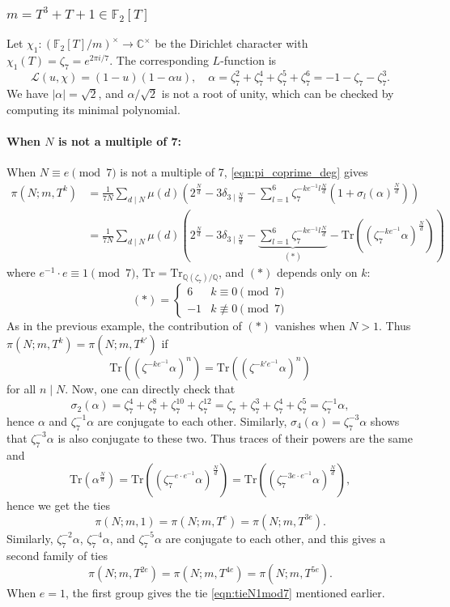 \documentclass[10pt,reqno]{amsproc}
\newcommand{\Tr}{\mathrm{Tr}}
\newcommand{\bC}{\mathbb{C}}
\newcommand{\bF}{\mathbb{F}}
\newcommand{\bQ}{\mathbb{Q}}
\newcommand{\cL}{\mathcal{L}}
\newcommand{\1}{\mathds{1}}	%
\theoremstyle{definition}
\theoremstyle{remark}
\begin{document}
\subsubsection{\texorpdfstring{\(m = T^3 + T + 1 \in \bF_2[T]\)}{m = T^3 + T + 1 over characteristic 2}}
\label{subsubsec:p2T3T1}

Let \(\chi_1: (\bF_2[T] / m)^\times \to \bC^\times\) be the Dirichlet character with \(\chi_1(T) = \zeta_7 = e^{2\pi i / 7}\).
The corresponding \(L\)-function is
\[
\cL(u, \chi) = (1 - u)(1 - \alpha u), \quad \alpha = \zeta_7^2 + \zeta_7^4 + \zeta_7^5 + \zeta_7^6 = -1 - \zeta_7 - \zeta_7^3.
\]
We have \(|\alpha| = \sqrt{2}\), and $\alpha / \sqrt{2}$ is not a root of unity, which can be checked by computing its minimal polynomial.

\paragraph{\textbf{When $N$ is not a multiple of 7:}}
When $N \equiv e \pmod{7}$ is not a multiple of 7, \eqref{eqn:pi_coprime_deg} gives
\begin{align*}
    \pi(N; m, T^k) &= \frac{1}{7N} \sum_{d \mid N} \mu(d) \left(2^{\frac{N}{d}} - 3 \delta_{3 \mid \frac{N}{d}} - \sum_{l=1}^{6} \zeta_7^{-ke^{-1}l \frac{N}{d}} (1 + \sigma_l(\alpha)^{\frac{N}{d}})\right) \\
    &= \frac{1}{7N} \sum_{d \mid N} \mu(d) \left(2^{\frac{N}{d}} - 3 \delta_{3 \mid \frac{N}{d}} - \underbrace{\sum_{l=1}^{6} \zeta_7^{-ke^{-1}l \frac{N}{d}}}_{(*)}  - \Tr((\zeta_7^{-ke^{-1}} \alpha)^{\frac{N}{d}})\right)
\end{align*}
where $e^{-1} \cdot e \equiv 1 \pmod{7}$, $\Tr = \Tr_{\bQ(\zeta_7) / \bQ}$, and $(*)$ depends only on $k$:
\[
(*) = \begin{cases}
    6 & k \equiv 0 \pmod{7} \\ -1 & k \not\equiv 0 \pmod{7}
\end{cases}
\]
As in the previous example, the contribution of $(*)$ vanishes when $N > 1$.
Thus $\pi(N; m, T^k) = \pi(N; m, T^{k'})$ if
\[
\Tr((\zeta^{-ke^{-1}} \alpha)^{n}) = \Tr((\zeta^{-k'e^{-1}}\alpha)^{n})
\]
for all $n \mid N$.
Now, one can directly check that
\begin{equation}
    \label{eqn:T3T1conj}
\sigma_2(\alpha) = \zeta_7^4 + \zeta_7^8 + \zeta_7^{10} + \zeta_7^{12} = \zeta_{7} + \zeta_{7}^{3} + \zeta_{7}^{4} + \zeta_{7}^{5} = \zeta_{7}^{-1} \alpha,
\end{equation}
hence \(\alpha\) and \(\zeta_7^{-1} \alpha\) are conjugate to each other.
Similarly, \(\sigma_4(\alpha) = \zeta_7^{-3}\alpha\) shows that \(\zeta_7^{-3}\alpha\) is also conjugate to these two.
Thus traces of their powers are the same and
\[
\Tr(\alpha^\frac{N}{d}) = \Tr((\zeta_7^{-e \cdot e^{-1}} \alpha)^{\frac{N}{d}}) = \Tr((\zeta_7^{-3e \cdot e^{-1}} \alpha)^{\frac{N}{d}}),
\]
hence we get the ties
\[
\pi(N; m, 1) = \pi(N; m, T^e) = \pi(N; m, T^{3e}).
\]
Similarly, $\zeta_7^{-2} \alpha$, $\zeta_7^{-4} \alpha$, and $\zeta_{7}^{-5}\alpha$ are conjugate to each other, and this gives a second family of ties
\[
\pi(N; m, T^{2e}) = \pi(N; m, T^{4e}) = \pi(N; m, T^{5e}).
\]
When $e = 1$, the first group gives the tie \eqref{eqn:tieN1mod7} mentioned earlier.
\end{document}
